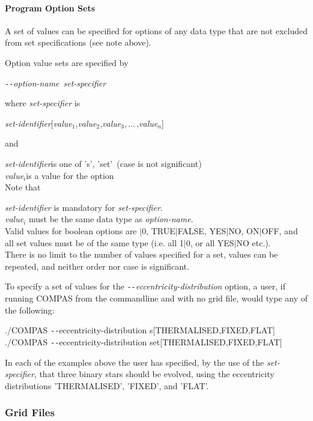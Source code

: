 \paragraph{Program Option Sets}\label{sec:ProgramOptionsSets}\mbox{}

A set of values can be specified for options of any data type that are not excluded from set specifications (see note above).

Option value sets are specified by

\tabto{3em}\texttt{-{}-}\textit{option-name}~\textit{set-specifier}

where \textit{set-specifier} is

\tabto{3em}\textit{set-identifier}[\textit{value$_1$},\textit{value$_2$},\textit{value$_3$},\,...\,,\textit{value$_n$}]

and 

\textit{set-identifier}\tabto{7em}is one of \lcb's', 'set'\rcb~(case is not significant)\\
\textit{value$_i$}\tabto{7em}is a value for the option\\

Note that

\textit{set-identifier} is mandatory for \textit{set-specifier}.\\
\textit{value$_i$} must be the same data type as \textit{option-name}.\\
Valid values for boolean options are $\vert$0, TRUE$\vert$FALSE, YES$\vert$NO, ON$\vert$OFF\rcb, and all set values must be of the same type (i.e. all 1$\vert$0, or all YES$\vert$NO etc.).\\
There is no limit to the number of values specified for a set, values can be repeated, and neither order nor case is significant.

To specify a set of values for the \textit{\texttt{-{}-}eccentricity-distribution} option, a user, if running COMPAS from the commandline and with no grid file, would type any of the following:

\tabto{3em}./COMPAS \texttt{-{}-}eccentricity-distribution s[THERMALISED,FIXED,FLAT]\\
\tabto{3em}./COMPAS \texttt{-{}-}eccentricity-distribution set[THERMALISED,FIXED,FLAT]

In each of the examples above the user has specified, by the use of the \textit{set-specifier}, that three binary stars should be evolved, using the eccentricity distributions 'THERMALISED', 'FIXED', and 'FLAT'.

\subsubsection{Grid Files}\label{sec:GridFiles}

